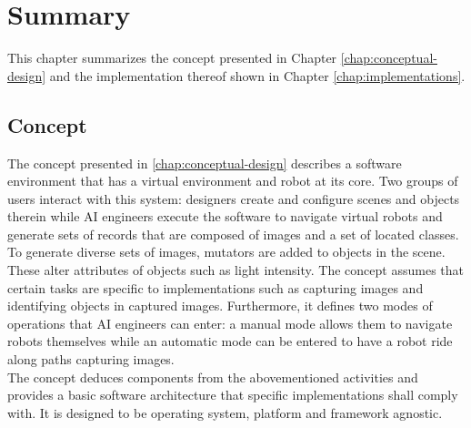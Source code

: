 \chapter{Summary}
\label{chap:summary}
This chapter summarizes the concept presented in Chapter \ref{chap:conceptual-design} and the implementation thereof shown in Chapter \ref{chap:implementations}.

\section{Concept}
The concept presented in \ref{chap:conceptual-design} describes a software environment that has a virtual environment and robot at its core. Two groups of users interact with this system: designers create and configure scenes and objects therein while \ac{AI} engineers execute the software to navigate virtual robots and generate sets of records that are composed of images and a set of located classes. To generate diverse sets of images, mutators are added to objects in the scene. These alter attributes of objects such as light intensity. The concept assumes that certain tasks are specific to implementations such as capturing images and identifying objects in captured images. Furthermore, it defines two modes of operations that \ac{AI} engineers can enter: a manual mode allows them to navigate robots themselves while an automatic mode can be entered to have a robot ride along paths capturing images.\\
The concept deduces components from the abovementioned activities and provides a basic software architecture that specific implementations shall comply with. It is designed to be operating system, platform and framework agnostic.

